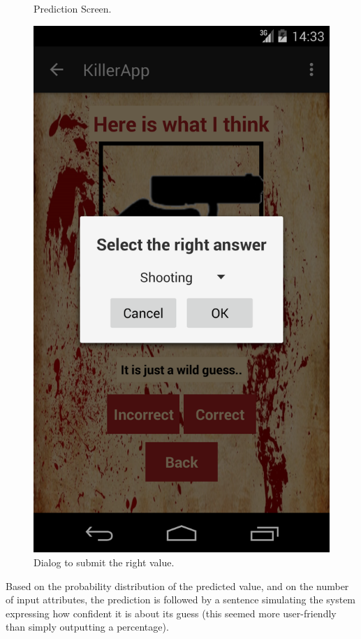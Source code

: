 \documentclass{mproj}
\begin{document}
\begin{figure}[h]
		\caption{Prediction Screen.}
		\label{fig:prediction_screen}		
	\endminipage\quad
		\includegraphics[width=\linewidth]{images/right_answer_dialog}
		\caption{Dialog to submit the right value.}
		\label{fig:right_answer_dialog}		
	\endminipage
\end{figure}

Based on the probability distribution of the predicted value, and on the number of input attributes, the prediction is followed by a sentence simulating the system expressing how confident it is about its guess (this seemed more user-friendly than simply outputting a percentage).\par
\end{document}
